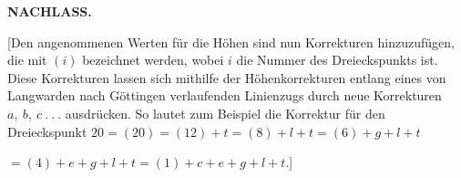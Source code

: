 \par\clearpage
\noindent{}\hfill{\small\textbf{NACHLASS.}}\hfill\null\par\medskip
\par\noindent\hspace*{\parindent}[Den angenommenen Werten für die Höhen sind nun Korrekturen
hinzuzufügen, die mit \((i)\) bezeichnet werden, wobei \(i\) die Nummer des Dreieckspunkts
ist. Diese Korrekturen lassen sich mithilfe der Höhenkorrekturen entlang
eines von Langwarden nach Göttingen verlaufenden Linienzugs durch neue Korrekturen
\(a,\ b,\ c\ .\ .\ .\) ausdrücken. So lautet zum Beispiel die Korrektur für den Dreieckspunkt
\(20=(20)=(12)+t=(8)+l+t=(6)+g+l+t\)
\par\noindent\hfill \(=(4)+e+g+l+t=(1)+c+e+g+l+t.\)]
\par\medskip
